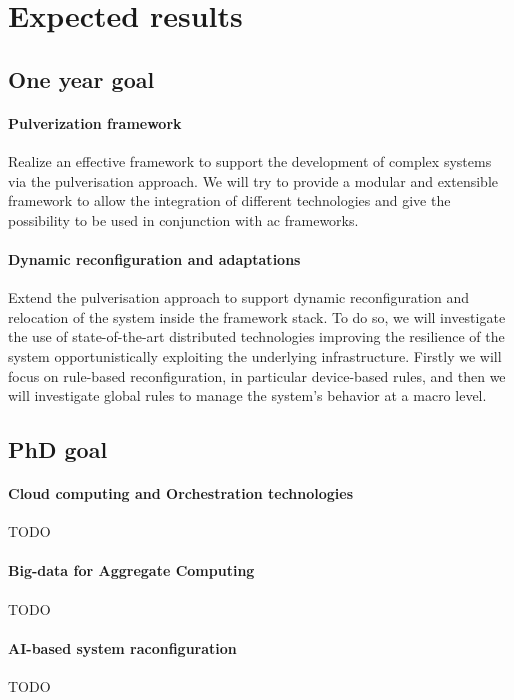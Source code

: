 \documentclass[12pt]{article}
\newcommand{\meta}[1]{{\color{blue}#1}}
\begin{document}
\section{Expected results}\label{sec:expected-results}

\subsection{One year goal}

\paragraph{Pulverization framework}
Realize an effective framework to support the development of complex systems
via the pulverisation approach.
%
We will try to provide a modular and extensible framework to allow the integration
of different technologies and give the possibility to be used in conjunction with
\ac{ac} frameworks.

\paragraph{Dynamic reconfiguration and adaptations}
Extend the pulverisation approach to support dynamic reconfiguration and relocation
of the system inside the framework stack.
%
To do so,
we will investigate the use of state-of-the-art distributed technologies
improving the resilience of the system opportunistically exploiting
the underlying infrastructure.
%
Firstly we will focus on rule-based reconfiguration,
in particular device-based rules, and then we will investigate
global rules to manage the system's behavior at a macro level.

\subsection{PhD goal}

\paragraph{Cloud computing and Orchestration technologies}
\meta{TODO}

\paragraph{Big-data for Aggregate Computing}
\meta{TODO}

\paragraph{AI-based system raconfiguration}
\meta{TODO}
\end{document}
